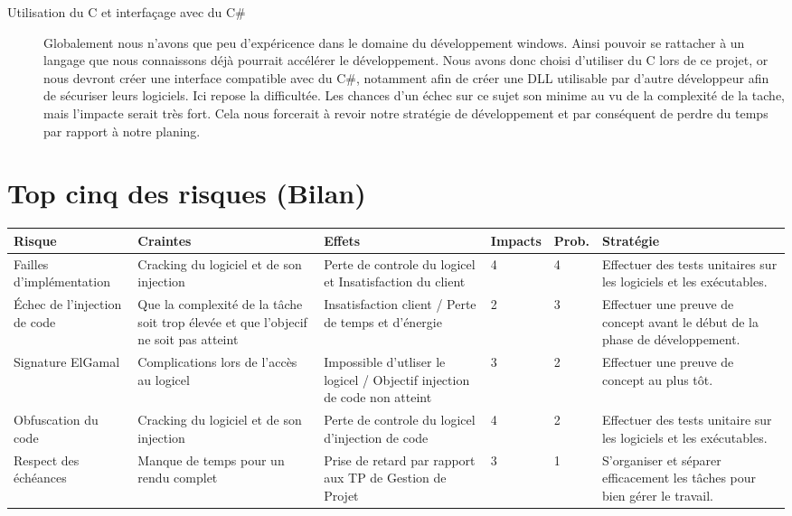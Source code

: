 \begin{description}
\item[Utilisation du C et interfaçage avec du C\#]
	Globalement nous n'avons que peu d'expéricence dans le domaine du développement windows. Ainsi pouvoir se rattacher à un langage que nous
	connaissons déjà pourrait accélérer le développement. Nous avons donc choisi d'utiliser du C lors de ce projet, or nous devront créer une 
	interface compatible avec du C\#, notamment afin de créer une DLL utilisable par d'autre développeur afin de sécuriser leurs logiciels.
	Ici repose la difficultée. Les chances d'un échec sur ce sujet son minime au vu de la complexité de la tache, mais l'impacte serait très fort.
	Cela nous forcerait à revoir notre stratégie de développement et par conséquent de perdre du temps par rapport à notre planing.

\end{description}

\chapter{Top cinq des risques (Bilan)}
\label{chapter:bilan}

\begin{table}[!h]
    \small
    \begin{tabular}{|m{2.5cm}|m{2.5cm}|m{2.5cm}|m{1.5cm}|m{1.5cm}|m{4cm}|} 
	\hline
	\textbf{Risque} & \textbf{Craintes} & \textbf{Effets} & \textbf{Impacts} & \textbf{Prob.} & \textbf{Stratégie}\\
	\hline
	Failles d'implémentation 
		& Cracking du logiciel et de son injection 
		& Perte de controle du logicel et Insatisfaction du client 
		& 4
		& 4 
		& Effectuer des tests unitaires sur les logiciels et les exécutables.\\
	\hline
	Échec de l'injection de code 
		& Que la complexité de la tâche soit trop élevée et que l'objecif ne soit pas atteint 
		& Insatisfaction client / Perte de temps et d'énergie 
		& 2 
		& 3 
		& Effectuer une preuve de concept avant le début de la phase de développement.\\
	\hline
	Signature ElGamal 
		& Complications lors de l'accès au logicel 
		& Impossible d'utliser le logicel / Objectif injection de code non atteint 
		& 3
		& 2 
		& Effectuer une preuve de concept au plus tôt.\\
	\hline
	Obfuscation du code 
		& Cracking du logiciel et de son injection 
		& Perte de controle du logicel d'injection de code 
		& 4
		& 2
		& Effectuer des tests unitaire sur les logiciels et les exécutables.\\
	\hline
	Respect des échéances 
		& Manque de temps pour un rendu complet 
		& Prise de retard par rapport aux TP de Gestion de Projet
		& 3
		& 1 
		& S’organiser et séparer efficacement les tâches pour bien gérer le travail.\\
	\hline	    
    \end{tabular}
\end{table}

